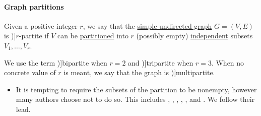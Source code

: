 \paragraph{Graph partitions}

\begin{definition}\label{def:multipartite_graph}
  Given a positive integer \( r \), we say that the \hyperref[def:undirected_graph]{simple undirected graph} \( G = (V, E) \) is \term[ru=\( r \)-дольный (граф) (\cite[11]{Емеличев1990})]{\( r \)-partite} if \( V \) can be \hyperref[def:set_partition]{partitioned} into \( r \) (possibly empty) \hyperref[def:graph_independent_set]{independent} subsets \( V_1, \ldots, V_r \).

  We use the term \term[ru=двудольный (граф) (\cite[11]{Емеличев1990})]{bipartite} when \( r = 2 \) and \term[ru=трёхдольный (граф) (\cite[11]{Емеличев1990})]{tripartite} when \( r = 3 \). When no concrete value of \( r \) is meant, we say that the graph is \term[en=multipartite (graph) (\cite[ex. 8.5.5]{Knauer2011})]{multipartite}.
\end{definition}
\begin{itemize}
  \item It is tempting to require the subsets of the partition to be nonempty, however many authors choose not to do so. This includes , , , , ,  and . We follow their lead.
\end{itemize}

